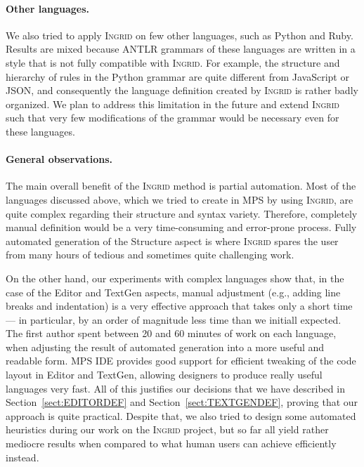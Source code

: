\paragraph{Other languages.}
We also tried to apply \textsc{Ingrid} on few other languages, such as Python and Ruby.
Results are mixed because ANTLR grammars of these languages are written in a style that is not fully compatible with \textsc{Ingrid}.
For example, the structure and hierarchy of rules in the Python grammar are quite different from JavaScript or JSON, and consequently the language definition created by \textsc{Ingrid} is rather badly organized.
We plan to address this limitation in the future and extend \textsc{Ingrid} such that very few modifications of the grammar would be necessary even for these languages.

\paragraph{General observations.}
The main overall benefit of the \textsc{Ingrid} method is partial automation.
Most of the languages discussed above, which we tried to create in MPS by using \textsc{Ingrid}, are quite complex regarding their structure and syntax variety.
Therefore, completely manual definition would be a very time-consuming and error-prone process.
Fully automated generation of the Structure aspect is where \textsc{Ingrid} spares the user from many hours of tedious and sometimes quite challenging work.

On the other hand, our experiments with complex languages show that, in the case of the Editor and TextGen aspects, manual adjustment (e.g., adding line breaks and indentation) is a very effective approach that takes only a short time --- in particular, by an order of magnitude less time than we initiall expected.
The first author spent between 20 and 60 minutes of work on each language, when adjusting the result of automated generation into a more useful and readable form.
MPS IDE provides good support for efficient tweaking of the code layout in Editor and TextGen, allowing designers to produce really useful languages very fast.
All of this justifies our decisions that we have described in Section~\ref{sect:EDITORDEF} and Section~\ref{sect:TEXTGENDEF}, proving that our approach is quite practical.
Despite that, we also tried to design some automated heuristics during our work on the \textsc{Ingrid} project, but so far all yield rather mediocre results when compared to what human users can achieve efficiently instead.

